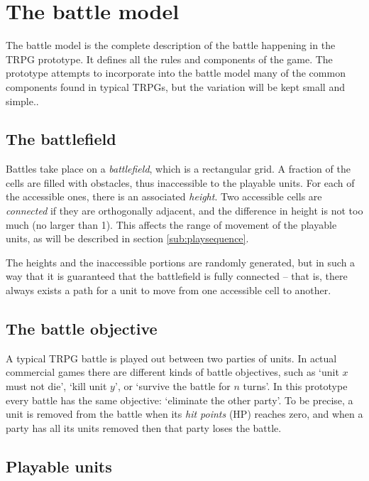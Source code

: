 \section{The battle model}

The battle model is the complete description of the battle happening in the TRPG prototype. It defines all the rules and components of the game. The prototype attempts to incorporate into the battle model many of the common components found in typical TRPGs, but the variation will be kept small and simple..

\subsection{The battlefield}

Battles take place on a \textit{battlefield}, which is a rectangular grid. A fraction of the cells are filled with obstacles, thus inaccessible to the playable units. For each of the accessible ones, there is an associated \textit{height}. Two accessible cells are \textit{connected} if they are orthogonally adjacent, and the difference in height is not too much (no larger than 1). This affects the range of movement of the playable units, as will be described in section \ref*{sub:playsequence}.

The heights and the inaccessible portions are randomly generated, but in such a way that it is guaranteed that the battlefield is fully connected -- that is, there always exists a path for a unit to move from one accessible cell to another.

\subsection{The battle objective}

A typical TRPG battle is played out between two parties of units. In actual commercial games there are different kinds of battle objectives, such as `unit $x$ must not die', `kill unit $y$', or `survive the battle for $n$ turns'. In this prototype every battle has the same objective: `eliminate the other party'. To be precise, a unit is removed from the battle when its \textit{hit points} (HP) reaches zero, and when a party has all its units removed then that party loses the battle.

\subsection{Playable units}

